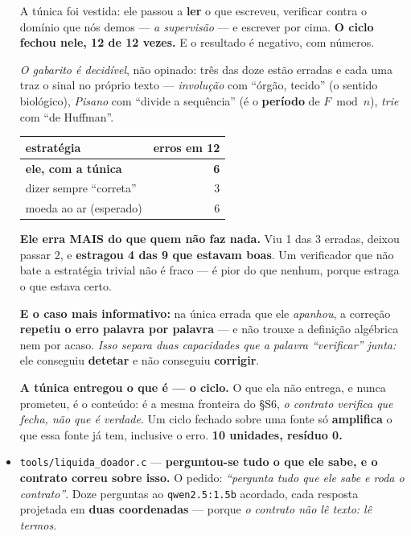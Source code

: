 \documentclass[11pt]{article}
\newcommand{\code}[1]{\texttt{\small #1}}
\theoremstyle{plain}
\theoremstyle{remark}
\begin{document}
\begin{itemize}
A túnica foi vestida: ele passou a \textbf{ler} o que escreveu, verificar contra o domínio que nós
demos --- \emph{a supervisão} --- e escrever por cima. \textbf{O ciclo fechou nele, 12 de 12 vezes.}
E o resultado é negativo, com números.

\emph{O gabarito é decidível}, não opinado: três das doze estão erradas e cada uma traz o sinal no
próprio texto --- \emph{involução} com ``órgão, tecido'' (o sentido biológico), \emph{Pisano} com
``divide a sequência'' (é o \textbf{período} de $F \bmod n$), \emph{trie} com ``de Huffman''.

\begin{center}
\begin{tabular}{lr}
\toprule
estratégia & erros em 12 \\
\midrule
\textbf{ele, com a túnica} & \textbf{6} \\
dizer sempre ``correta'' & 3 \\
moeda ao ar (esperado) & 6 \\
\bottomrule
\end{tabular}
\end{center}

\noindent \textbf{Ele erra MAIS do que quem não faz nada.} Viu 1 das 3 erradas, deixou passar 2, e
\textbf{estragou 4 das 9 que estavam boas}. Um verificador que não bate a estratégia trivial não é
fraco --- é pior do que nenhum, porque estraga o que estava certo.

\textbf{E o caso mais informativo:} na única errada que ele \emph{apanhou}, a correção
\textbf{repetiu o erro palavra por palavra} --- e não trouxe a definição algébrica nem por acaso.
\emph{Isso separa duas capacidades que a palavra ``verificar'' junta:} ele conseguiu \textbf{detetar}
e não conseguiu \textbf{corrigir}.

\textbf{A túnica entregou o que é --- o ciclo.} O que ela não entrega, e nunca prometeu, é o
conteúdo: é a mesma fronteira do §S6, \emph{o contrato verifica que fecha, não que é verdade}. Um
ciclo fechado sobre uma fonte só \textbf{amplifica} o que essa fonte já tem, inclusive o erro.
\textbf{10 unidades, resíduo 0.}

\item \code{tools/liquida\_doador.c} --- \textbf{perguntou-se tudo o que ele sabe, e o contrato
correu sobre isso.} O pedido: \emph{``pergunta tudo que ele sabe e roda o contrato''}. Doze
perguntas ao \code{qwen2.5:1.5b} acordado, cada resposta projetada em \textbf{duas coordenadas} ---
porque \emph{o contrato não lê texto: lê termos}.


\end{itemize}
\end{document}
